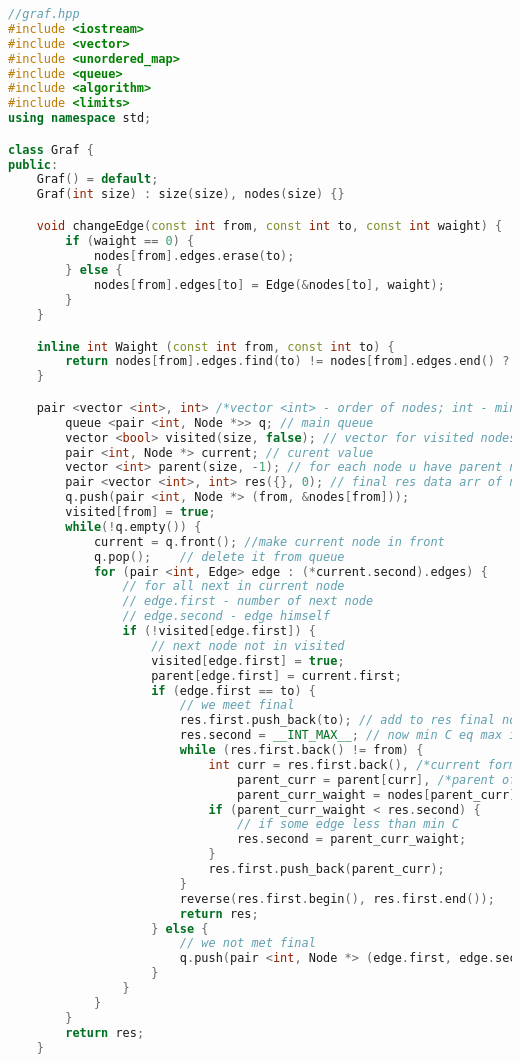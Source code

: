 \pagebreak


\begin{lstlisting}[language=C++]
//graf.hpp
#include <iostream>
#include <vector>
#include <unordered_map>
#include <queue>
#include <algorithm>
#include <limits>
using namespace std;

class Graf {
public:
    Graf() = default;
    Graf(int size) : size(size), nodes(size) {}

    void changeEdge(const int from, const int to, const int waight) {
        if (waight == 0) {
            nodes[from].edges.erase(to);
        } else {
            nodes[from].edges[to] = Edge(&nodes[to], waight);
        }
    }

    inline int Waight (const int from, const int to) {
        return nodes[from].edges.find(to) != nodes[from].edges.end() ? nodes[from].edges[to].waight : 0;
    }

    pair <vector <int>, int> /*vector <int> - order of nodes; int - min waight*/ findShortestPath (const int from, const int to) {
        queue <pair <int, Node *>> q; // main queue
        vector <bool> visited(size, false); // vector for visited nodes
        pair <int, Node *> current; // curent value
        vector <int> parent(size, -1); // for each node u have parent node and it index
        pair <vector <int>, int> res({}, 0); // final res data arr of number of noder and min C
        q.push(pair <int, Node *> (from, &nodes[from]));
        visited[from] = true;
        while(!q.empty()) {
            current = q.front(); //make current node in front
            q.pop();    // delete it from queue
            for (pair <int, Edge> edge : (*current.second).edges) {
                // for all next in current node
                // edge.first - number of next node
                // edge.second - edge himself
                if (!visited[edge.first]) {
                    // next node not in visited
                    visited[edge.first] = true;
                    parent[edge.first] = current.first;
                    if (edge.first == to) {
                        // we meet final
                        res.first.push_back(to); // add to res final node
                        res.second = __INT_MAX__; // now min C eq max int (infinity)
                        while (res.first.back() != from) {
                            int curr = res.first.back(), /*current form last*/
                                parent_curr = parent[curr], /*parent of current*/
                                parent_curr_waight = nodes[parent_curr].edges[curr].waight; /*waight of way btn them from parent to relative*/
                            if (parent_curr_waight < res.second) {
                                // if some edge less than min C
                                res.second = parent_curr_waight;
                            }
                            res.first.push_back(parent_curr);
                        }
                        reverse(res.first.begin(), res.first.end());
                        return res;
                    } else {
                        // we not met final
                        q.push(pair <int, Node *> (edge.first, edge.second.node));
                    }
                }
            }
        }
        return res;
    }


\end{lstlisting}
